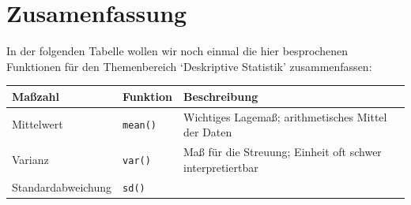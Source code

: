 \documentclass[]{book}
\begin{document}
\section{Zusamenfassung}\label{zusamenfassung}

In der folgenden Tabelle wollen wir noch einmal die hier besprochenen
Funktionen für den Themenbereich `Deskriptive Statistik' zusammenfassen:

\begin{longtable}[]{@{}lll@{}}
\toprule
\begin{minipage}[b]{0.13\columnwidth}\raggedright\strut
Maßzahl\strut
\end{minipage} & \begin{minipage}[b]{0.33\columnwidth}\raggedright\strut
Funktion\strut
\end{minipage} & \begin{minipage}[b]{0.46\columnwidth}\raggedright\strut
Beschreibung\strut
\end{minipage}\tabularnewline
\midrule
\endhead
\begin{minipage}[t]{0.13\columnwidth}\raggedright\strut
Mittelwert\strut
\end{minipage} & \begin{minipage}[t]{0.33\columnwidth}\raggedright\strut
\texttt{mean()}\strut
\end{minipage} & \begin{minipage}[t]{0.46\columnwidth}\raggedright\strut
Wichtiges Lagemaß; arithmetisches Mittel der Daten\strut
\end{minipage}\tabularnewline
\begin{minipage}[t]{0.13\columnwidth}\raggedright\strut
Varianz\strut
\end{minipage} & \begin{minipage}[t]{0.33\columnwidth}\raggedright\strut
\texttt{var()}\strut
\end{minipage} & \begin{minipage}[t]{0.46\columnwidth}\raggedright\strut
Maß für die Streuung; Einheit oft schwer interpretiertbar\strut
\end{minipage}\tabularnewline
\begin{minipage}[t]{0.13\columnwidth}\raggedright\strut
Standardabweichung\strut
\end{minipage} & \begin{minipage}[t]{0.33\columnwidth}\raggedright\strut
\texttt{sd()}\strut
\end{minipage} & \begin{minipage}[t]{0.46\columnwidth}\raggedright\strut

\end{minipage}
\end{longtable}
\end{document}
